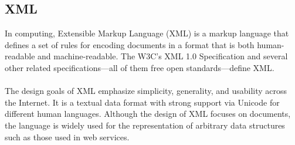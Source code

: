 \documentclass[a4paper, 12pt]{report}
\begin{document}
\subsection{XML}
In computing, Extensible Markup Language (XML) is a markup language that defines a set of rules for encoding documents in a format that is both human-readable and machine-readable. The W3C's XML 1.0 Specification and several other related specifications—all of them free open standards—define XML.
\\\\\hspace*{0.8cm}
The design goals of XML emphasize simplicity, generality, and usability across the Internet. It is a textual data format with strong support via Unicode for different human languages. Although the design of XML focuses on documents, the language is widely used for the representation of arbitrary data structures such as those used in web services.
\newpage
\end{document}
